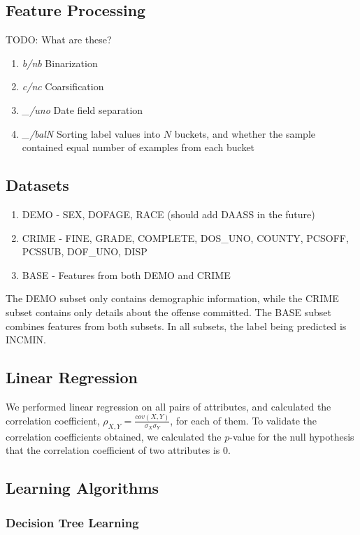 \documentclass[]{article}
\begin{document}
\subsection{Feature Processing}

TODO: What are these?

\begin{enumerate}
	\item \emph{b/nb} Binarization
	\item \emph{c/nc} Coarsification
	\item \emph{\_/uno} Date field separation
	\item \emph{\_/balN} Sorting label values into $N$ buckets, and whether the sample contained equal number of examples from each bucket
\end{enumerate}

\subsection{Datasets}
\begin{enumerate}
	\item DEMO - SEX, DOFAGE, RACE (should add DAASS in the future)
	\item CRIME - FINE, GRADE, COMPLETE, DOS\_UNO, COUNTY, PCSOFF, PCSSUB, DOF\_UNO, DISP
	\item BASE - Features from both DEMO and CRIME
\end{enumerate}

The DEMO subset only contains demographic information, while the CRIME subset contains only details about the offense committed. The BASE subset combines features from both subsets. In all subsets, the label being predicted is INCMIN.

\subsection{Linear Regression}
We performed linear regression on all pairs of attributes, and calculated the correlation coefficient, $\rho_{X,Y} = \frac{cov(X,Y)}{\sigma_X\sigma_Y}$, for each of them. To validate the correlation coefficients obtained, we calculated the $p$-value for the null hypothesis that the correlation coefficient of two attributes is 0.

\subsection{Learning Algorithms}

\subsubsection{Decision Tree Learning}
\end{document}
